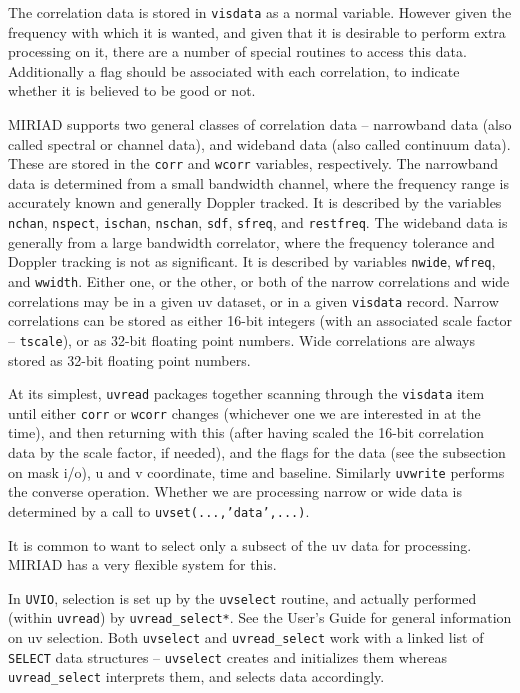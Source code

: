 
The correlation data is stored in {\tt visdata} as a normal variable. However
given the frequency with which it is wanted, and given that it is desirable
to perform extra processing on it, there are a number of special routines
to access this data. Additionally a flag should be associated with each
correlation, to indicate whether it is believed to be good or not.

MIRIAD supports two general classes of correlation data -- narrowband data
(also called spectral or channel data), and wideband data (also called
continuum data). These are stored
in the {\tt corr} and {\tt wcorr} variables, respectively. The narrowband
data is determined from a small bandwidth channel, where the frequency
range is accurately known and generally Doppler tracked. It is described by
the variables {\tt nchan}, {\tt nspect}, {\tt ischan},
{\tt nschan}, {\tt sdf}, {\tt sfreq}, and {\tt restfreq}. The wideband data
is generally from a large bandwidth correlator, where the frequency
tolerance and Doppler tracking is not as significant. It is described by
variables {\tt nwide}, {\tt wfreq}, and {\tt wwidth}. Either one, or the other,
or both of the narrow correlations  and wide correlations may be in a given
uv dataset, or in a given {\tt visdata} record. Narrow correlations can be
stored as either 16-bit integers (with an associated scale factor --
{\tt tscale}), or as 32-bit floating point numbers. Wide correlations are
always stored as 32-bit floating point numbers.

At its simplest, {\tt uvread} packages together scanning through the
{\tt visdata} item until either {\tt corr} or {\tt wcorr} changes (whichever
one we are interested in at the time), and then returning with this (after
having scaled the 16-bit correlation data by the scale factor, if needed),
and the flags for the data (see the subsection on mask i/o), u and v
coordinate, time and baseline. Similarly {\tt uvwrite} performs the
converse operation. Whether we are processing narrow or wide data is
determined by a call to {\tt uvset(...,'data',...)}.


It is common to want to select only a subsect of the uv data for processing.
MIRIAD has a very flexible system for this.

In {\tt UVIO}, selection is set up by the {\tt uvselect} routine,
and actually performed (within {\tt uvread}) by {\tt uvread\_select*}. See
the User's Guide for general information on uv selection. Both
{\tt uvselect} and {\tt uvread\_select} work with a linked list of
{\tt SELECT} data structures -- {\tt uvselect} creates and initializes them
whereas {\tt uvread\_select} interprets them, and selects data accordingly.


